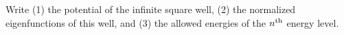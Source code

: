 

\vspace*{\fill}
\centering

Write (1) the potential of the infinite square well, (2) the normalized eigenfunctions of this well, and (3) the allowed energies of the $n^{\rm th}$ energy level.

\centering
\vspace*{\fill}

